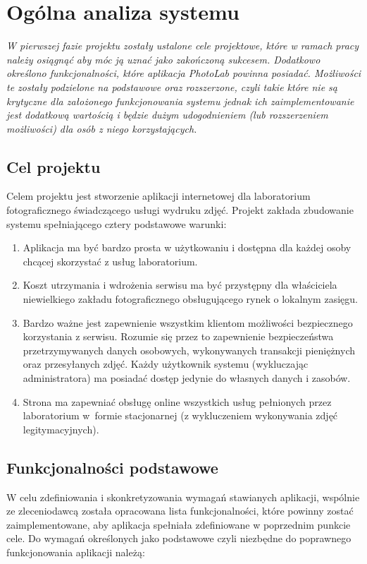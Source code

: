 \chapter{Ogólna analiza systemu}

{\em \quad W pierwszej fazie projektu zostały ustalone cele projektowe, które w ramach pracy należy osiągnąć aby móc ją uznać jako zakończoną sukcesem. Dodatkowo określono funkcjonalności, które aplikacja \textit{PhotoLab} powinna posiadać. Możliwości te zostały podzielone na podstawowe oraz rozszerzone, czyli takie które nie są krytyczne dla założonego funkcjonowania systemu jednak ich zaimplementowanie
jest dodatkową wartością i będzie dużym udogodnieniem (lub rozszerzeniem możliwości) dla osób z niego korzystających. }

\section{Cel projektu}
\quad Celem projektu jest stworzenie aplikacji internetowej dla laboratorium fotograficznego świadczącego usługi wydruku zdjęć. Projekt zakłada zbudowanie systemu spełniającego cztery podstawowe warunki:
\begin{enumerate}
    \item Aplikacja ma być bardzo prosta w użytkowaniu i dostępna dla każdej osoby chcącej skorzystać z usług laboratorium.
    \item Koszt utrzymania i wdrożenia serwisu ma być przystępny dla właściciela niewielkiego zakładu fotograficznego obsługującego rynek o lokalnym zasięgu.
    \item Bardzo ważne jest zapewnienie wszystkim klientom możliwości bezpiecznego korzystania z serwisu. Rozumie się przez to zapewnienie bezpieczeństwa przetrzymywanych danych osobowych, wykonywanych transakcji pieniężnych oraz przesyłanych zdjęć. Każdy użytkownik systemu (wykluczając administratora) ma posiadać dostęp jedynie do własnych danych i zasobów.
    \item Strona ma zapewniać obsługę online wszystkich usług pełnionych przez laboratorium w~formie stacjonarnej (z wykluczeniem wykonywania zdjęć legitymacyjnych).
\end{enumerate}



\section{Funkcjonalności podstawowe}
\quad W celu zdefiniowania i skonkretyzowania wymagań stawianych aplikacji, wspólnie ze zleceniodawcą została opracowana lista funkcjonalności, które powinny zostać zaimplementowane, aby aplikacja spełniała zdefiniowane w poprzednim punkcie cele. 
\newpage
\noindent Do wymagań określonych jako podstawowe czyli niezbędne do poprawnego funkcjonowania aplikacji należą:


